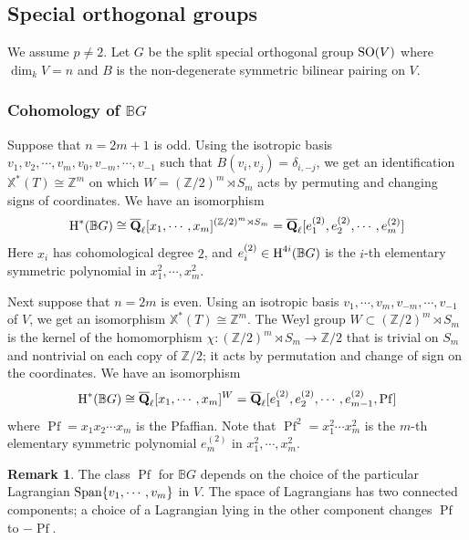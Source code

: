 \documentclass[reqno]{amsart}
\numberwithin{equation}{subsection}
\theoremstyle{definition}
\newtheorem{remark}[subsubsection]{Remark}
\def\BB{\mathbb{B}}
\def\ZZ{\mathbb{Z}}
\newcommand\Span{\textup{Span}}
\DeclareMathOperator\Pf{Pf}
\newcommand\SO{\textup{SO}}
\newcommand\xch{\mathbb{X}^*}
\newcommand{\Qlbar}{\overline{\Q}_\ell}
\newcommand{\cohog}[2]{\textup{H}^{#1}({#2})}     %
\renewcommand\d\delta
\newcommand{\s}{\sigma}
\newcommand{\Q}{\mathbf{Q}}
\begin{document}
\subsection{Special orthogonal groups} We assume $p \neq 2$. Let $G$ be the split special orthogonal group $\SO(V)$ where $\dim_{k}V=n$ and $B$ is the non-degenerate symmetric bilinear pairing on $V$.

\subsubsection{Cohomology of $\BB G$}
\label{ss: H BG SO}
Suppose that $n=2m+1$ is odd. Using the isotropic basis $v_{1},v_{2},\cdots, v_{m}, v_{0}, v_{-m},\cdots, v_{-1}$ such that $B(v_{i},v_{j})=\d_{i,-j}$, we get an identification $\xch(T)\cong \ZZ^{m}$ on which $W=(\ZZ/2)^{m}\rtimes S_{m}$ acts by permuting and changing signs of coordinates. We have an isomorphism
\begin{equation*}
\cohog{*}{\BB G}\cong \Qlbar[x_{1},\cdots, x_{m}]^{(\ZZ/2)^{m}\rtimes S_{m}}=\Qlbar[e_{1}^{(2)},e_{2}^{(2)},\cdots, e_{m}^{(2)}] 
\end{equation*}
Here $x_{i}$ has cohomological degree $2$, and $e_{i}^{(2)} \in \cohog{4i}{\BB G}$ is the $i$-th elementary symmetric polynomial in $x_{1}^{2},\cdots, x_{m}^{2}$. 



Next suppose that $n=2m$ is even. Using an isotropic basis $v_{1},\cdots, v_{m},v_{-m},\cdots, v_{-1}$ of $V$, we get an isomorphism $\xch(T)\cong \ZZ^{m}$. The Weyl group $W\subset (\ZZ/2)^{m}\rtimes S_{m}$ is the kernel of the homomorphism $\chi: (\ZZ/2)^{m}\rtimes S_{m}\to \ZZ/2$ that is trivial on $S_{m}$ and nontrivial on each copy of $\ZZ/2$; it acts by permutation and change of sign on the coordinates. We have an isomorphism
\begin{equation}\label{coho BSO even}
\cohog{*}{\BB G}\cong \Qlbar[x_{1},\cdots, x_{m}]^{W}=\Qlbar[e_1^{(2)},e_2^{(2)},\cdots, e_{m-1}^{(2)}, \Pf] 
\end{equation}
where $\Pf=x_{1}x_{2}\cdots x_{m}$ is the Pfaffian. Note that $\Pf^{2}=x_{1}^{2}\cdots x_{m}^{2}$ is the $m$-th elementary symmetric polynomial $e_m^{(2)}$ in $x_{1}^{2},\cdots, x_{m}^{2}$. 

\begin{remark} The class $\Pf$ for $\BB G$ depends on the choice of the particular Lagrangian $\Span\{v_{1},\cdots, v_{m}\}$ in $V$. The space of Lagrangians has two connected components; a choice of a Lagrangian lying in the other component changes $\Pf$ to $-\Pf$. 
\end{remark}
\end{document}
